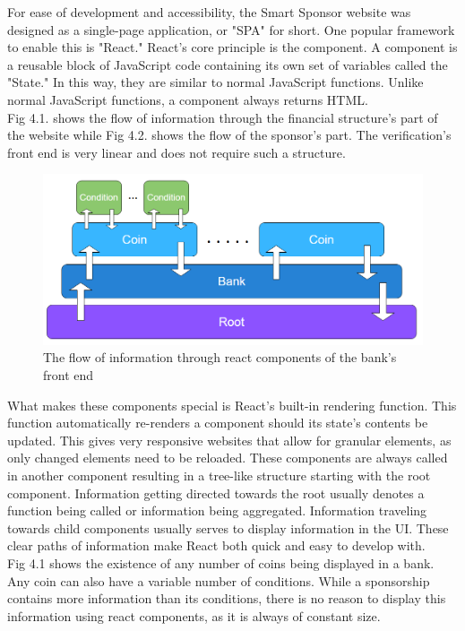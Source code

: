 For ease of development and accessibility, the Smart Sponsor website was designed as a single-page application, or "SPA" for short. One popular framework to enable this is "React." React's core principle is the component. A component is a reusable block of JavaScript code containing its own set of variables called the "State." In this way, they are similar to normal JavaScript functions. Unlike normal JavaScript functions, a component always returns HTML.\\
Fig 4.1. shows the flow of information through the financial structure's part of the website while Fig 4.2. shows the flow of the sponsor's part. The verification's front end is very linear and does not require such a structure.\\
\begin{figure}[H]
    \centering
    \includegraphics[scale=0.5]{figures/bank front end.PNG}  
    \caption{The flow of information through react components of the bank's front end}
    \label{fig:bankfront}
\end{figure}
What makes these components special is React's built-in rendering function. This function automatically re-renders a component should its state's contents be updated. This gives very responsive websites that allow for granular elements, as only changed elements need to be reloaded. These components are always called in another component resulting in a tree-like structure starting with the root component. Information getting directed towards the root usually denotes a function being called or information being aggregated. Information traveling towards child components usually serves to display information in the UI. These clear paths of information make React both quick and easy to develop with.\\
Fig 4.1 shows the existence of any number of coins being displayed in a bank. Any coin can also have a variable number of conditions. While a sponsorship contains more information than its conditions, there is no reason to display this information using react components, as it is always of constant size.\\
